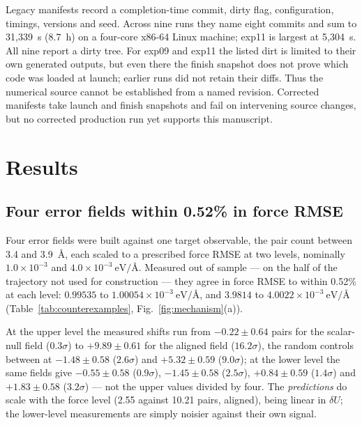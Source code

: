 \documentclass[aip,jcp,reprint,amsmath,amssymb,floatfix]{revtex4-2}
\newcommand{\dU}{\ensuremath{\delta U}}
\newcommand{\eVA}{\ensuremath{\mathrm{eV}/\text{\AA}}}
\begin{document}
Legacy manifests record a completion-time commit, dirty flag, configuration,
timings, versions and seed. Across nine runs they name eight commits and sum to
31{,}339~s (8.7~h) on a four-core x86-64 Linux machine; exp11 is largest at
5{,}304~s. All nine report a dirty tree. For exp09 and exp11 the listed dirt is
limited to their own generated outputs, but even there the finish snapshot does
not prove which code was loaded at launch; earlier runs did not retain their
diffs. Thus the numerical source cannot be established from a named revision.
Corrected manifests take launch and finish snapshots and fail on intervening
source changes, but no corrected production run yet supports this manuscript.

\section{Results}
\label{sec:results}

\subsection{Four error fields within 0.52\% in force RMSE}
\label{sec:counterexamples}

Four error fields were built against one target observable, the pair count
between 3.4 and 3.9~\AA, each scaled to a prescribed force RMSE at two
levels, nominally $1.0\times10^{-3}$ and $4.0\times10^{-3}~\eVA$. Measured out
of sample --- on the half of the trajectory not used for
construction --- they agree in force RMSE to within 0.52\% at
each level: $0.99535$ to $1.00054 \times 10^{-3}~\eVA$, and
$3.9814$ to $4.0022\times10^{-3}~\eVA$ (Table~\ref{tab:counterexamples},
Fig.~\ref{fig:mechanism}(a)).

At the upper level the measured shifts run from
$-0.22 \pm 0.64$ pairs for the scalar-null field ($0.3\sigma$) to
$+9.89 \pm 0.61$ for the aligned field ($16.2\sigma$), the
random controls between at $-1.48 \pm 0.58$ ($2.6\sigma$)
and $+5.32 \pm 0.59$ ($9.0\sigma$); at the lower level the same fields
give $-0.55 \pm 0.58$ ($0.9\sigma$), $-1.45 \pm 0.58$ ($2.5\sigma$),
$+0.84 \pm 0.59$ ($1.4\sigma$) and $+1.83 \pm 0.58$ ($3.2\sigma$) --- not the
upper values divided by four. The \emph{predictions} do scale with the force
level (2.55 against 10.21 pairs, aligned), being linear in $\dU$;
the lower-level measurements are simply noisier against their own signal.
\end{document}

